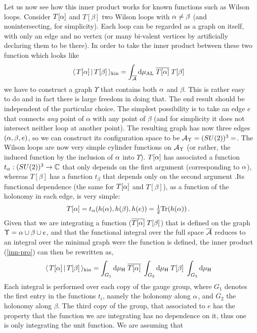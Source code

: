\documentclass[aps,prd,tightenlines,showpacs,nofootinbib,preprint]{revtex4}
\def\be{\begin{equation}}
\def\ee{\end{equation}}
\def\half{{\textstyle{1\over2}}}
\def\d{{\rm d}}
\begin{document}
Let us now see how this inner product works for known functions
such as Wilson loops. Consider $T[{\alpha}]$ and $T[\beta]$ two Wilson
loops with ${\alpha} \neq \beta$ (and nonintersecting, for simplicity).
Each loop can be regarded as a graph on itself, with only an edge
and no vertex (or many bi-valent vertices by artificially
declaring them to be there). In order to take the inner product
between these two function which looks like
%
\be \langle\, T[\a]\,|\,T[\beta]\, \rangle_{\rm
kin}=\int_{\overline{\cal A}} \d\mu_{\rm AL}\;
\overline{T[\a]}\;T[\beta]\label{inn-pro}
 \ee
%
we have to construct a graph $\Upsilon$ that contains both ${\alpha}$
and $\beta$. This is rather easy to do and in fact there is large
freedom in doing that. The end result should be independent of the
particular choice. The simplest possibility is to take an edge $e$
that connects {\it any} point of $\alpha$ with any point of
$\beta$ (and for simplicity it does not intersect neither loop at
another point). The resulting graph has now three edges
$({\alpha},\beta,e)$, so we can construct its configuration space to be
${\cal A}_\Upsilon=(SU(2))^3=$. The Wilson loops are now very
simple cylinder functions on ${\cal A}_\Upsilon$ (or rather, the
induced function by the inclusion of ${\alpha}$ into $\Upsilon$).
$T[{\alpha}]$ has associated a function $t_{\alpha}:(SU(2))^3\rightarrow
\mathbb{C}$ that only depends on the first argument (corresponding
to ${\alpha}$), whereas $T[\beta]$ has a function $t_\beta$ that depends
only on the second argument .Its functional dependence (the same
for $T[{\alpha}]$ and $T[\beta]$), as a function of the holonomy in each
edge, is very simple:
$$
T[\a]=t_\a(h(\a),h(\beta),h(e))=\half{\rm Tr}(h(\a))\, .
$$
Given that we are integrating a function
($\overline{T[{\alpha}]}\;T[\beta]$) that is defined on the graph
$\Upsilon={\alpha}\cup\beta\cup e$, and that the functional integral
over the full space $\overline{\cal A}$ reduces to an integral
over the minimal graph were the function is defined, the inner
product (\ref{inn-pro}) can then be rewritten as,
%
\be \langle\, T[\a]\,|\,T[\beta]\, \rangle_{\rm kin}=\int_{G_1}
\d\mu_{\rm H}\; \overline{T[\a]}\;\int_{G_2} \d\mu_{\rm
H}\;T[\beta]\; \int_{G_3} \d\mu_{\rm H} \label{inn-pro2}
 \ee
Each integral is performed over each copy of the gauge group,
where $G_1$ denotes the first entry in the functions $t_i$, namely
the holonomy along ${\alpha}$, and $G_2$ the holonomy along $\beta$. The
third copy of the group, that associated to $e$ has the property
that the function we are integrating has no dependence on it, thus
one is only integrating the unit function. We are assuming that
\end{document}
